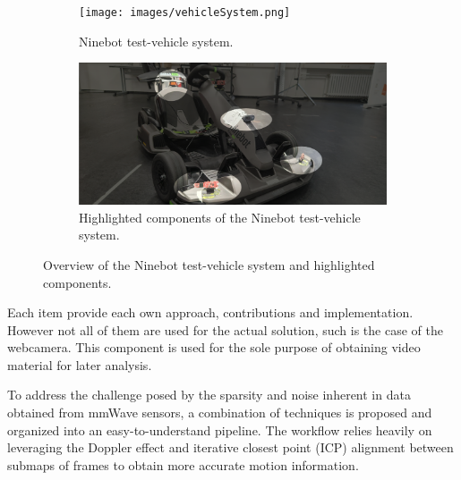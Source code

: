 \begin{figure}[!htbp]
    \centering
    \begin{subfigure}{0.9\linewidth}
        \centering
        \texttt{[image: images/vehicleSystem.png]}
        \caption{Ninebot test-vehicle system.}
        \label{fig:Ninebot_system}
    \end{subfigure}

    \vspace{1em} %

    \begin{subfigure}{0.9\linewidth}
        \centering
        \includegraphics[width=\linewidth]{images/vehicleSystemHighlight.png}
        \caption{Highlighted components of the Ninebot test-vehicle system.}
        \label{fig:Ninebot_system_highlight}
    \end{subfigure}

    \caption{Overview of the Ninebot test-vehicle system and highlighted components.}
    \label{fig:Ninebot_test-vehicle_System}
\end{figure}

Each item provide each own approach, contributions and implementation.
However not all of them are used for the actual solution, such is the case of the webcamera.
This component is used for the sole purpose of obtaining video material for later analysis.

To address the challenge posed by the sparsity and noise inherent in data obtained from mmWave sensors, a combination of techniques is proposed and organized into an easy-to-understand pipeline.
The workflow relies heavily on leveraging the Doppler effect and iterative closest point (ICP) alignment between submaps of frames to obtain more accurate motion information.

